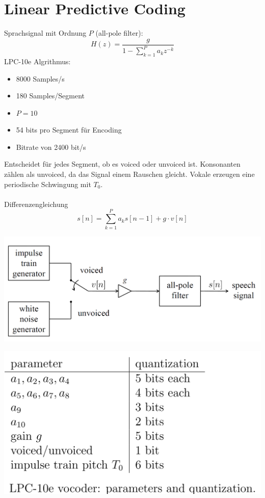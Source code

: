 \section{Linear Predictive Coding}
Sprachsignal mit Ordnung $P$ (all-pole filter):
\[ H(z) = \frac{g}{1-\sum_{k=1}^{P}a_kz^{-k}} \]
LPC-10e Algrithmus:
\begin{itemize}
	\item 8000 Samples/s
	\item 180 Samples/Segment
	\item $P=10$
	\item 54 bits pro Segment für Encoding
	\item Bitrate von 2400 bit/s
\end{itemize}
Entscheidet für jedes Segment, ob es voiced oder unvoiced ist. Konsonanten zählen
als unvoiced, da das Signal einem Rauschen gleicht. Vokale erzeugen eine 
periodische Schwingung mit $T_0$.\\
\\
Differenzengleichung
\[ s[n] = \sum_{k=1}^{P}a_ks[n-1] + g \cdot v[n] \]
\begin{minipage}{.5\textwidth}
\begin{center}
	\includegraphics[width=\textwidth]{./images/speech_signal}
\end{center}
\end{minipage}
\begin{minipage}{.5\textwidth}
\begin{center}
	\includegraphics[width=\textwidth]{./images/lpc_10e}
\end{center}
\end{minipage}
